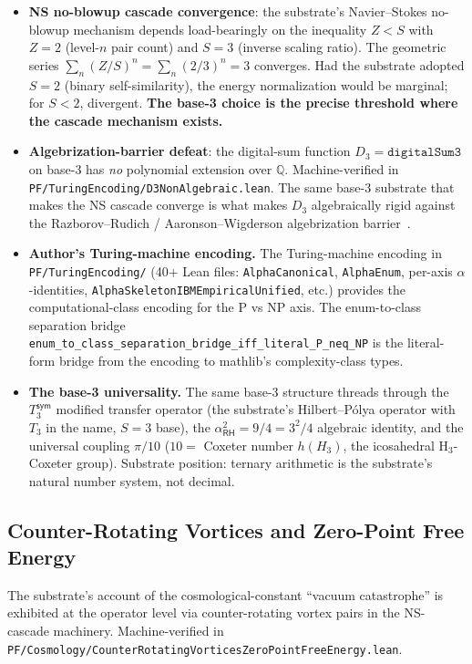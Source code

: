\documentclass[11pt,a4paper]{amsart}
\theoremstyle{plain}
\theoremstyle{definition}
\begin{document}
\begin{itemize}[itemsep=2pt,leftmargin=2em]
\item \textbf{NS no-blowup cascade convergence}: the substrate's Navier--Stokes no-blowup mechanism depends load-bearingly on the inequality $Z < S$ with $Z = 2$ (level-$n$ pair count) and $S = 3$ (inverse scaling ratio). The geometric series $\sum_n (Z/S)^n = \sum_n (2/3)^n = 3$ converges. Had the substrate adopted $S = 2$ (binary self-similarity), the energy normalization would be marginal; for $S < 2$, divergent. \textbf{The base-3 choice is the precise threshold where the cascade mechanism exists.}
\item \textbf{Algebrization-barrier defeat}: the digital-sum function $D_3 = \texttt{digitalSum3}$ on base-3 has \emph{no} polynomial extension over $\mathbb{Q}$. Machine-verified in \texttt{PF/TuringEncoding/D3NonAlgebraic.lean}. The same base-3 substrate that makes the NS cascade converge is what makes $D_3$ algebraically rigid against the Razborov--Rudich / Aaronson--Wigderson algebrization barrier~\cite{aaronson-wigderson2009}.
\item \textbf{Author's Turing-machine encoding.} The Turing-machine encoding in \texttt{PF/TuringEncoding/} (40+ Lean files: \texttt{AlphaCanonical}, \texttt{AlphaEnum}, per-axis $\alpha$-identities, \texttt{AlphaSkeletonIBMEmpiricalUnified}, etc.) provides the computational-class encoding for the P vs NP axis. The enum-to-class separation bridge \texttt{enum\_to\_class\_separation\_bridge\_iff\_literal\_P\_neq\_NP} is the literal-form bridge from the encoding to mathlib's complexity-class types.
\item \textbf{The base-3 universality.} The same base-3 structure threads through the $T_3^{\textsf{sym}}$ modified transfer operator (the substrate's Hilbert--P\'olya operator with $T_3$ in the name, $S = 3$ base), the $\alpha_{\textsf{RH}}^2 = 9/4 = 3^2/4$ algebraic identity, and the universal coupling $\pi/10$ ($10 = $ Coxeter number $h(H_3)$, the icosahedral H${}_3$-Coxeter group). Substrate position: ternary arithmetic is the substrate's natural number system, not decimal.
\end{itemize}

\subsection{Counter-Rotating Vortices and Zero-Point Free Energy}\label{subsec:counter-rotating}

The substrate's account of the cosmological-constant ``vacuum catastrophe'' is exhibited at the operator level via counter-rotating vortex pairs in the NS-cascade machinery. Machine-verified in \texttt{PF/Cosmology/CounterRotatingVorticesZeroPointFreeEnergy.lean}.
\end{document}
